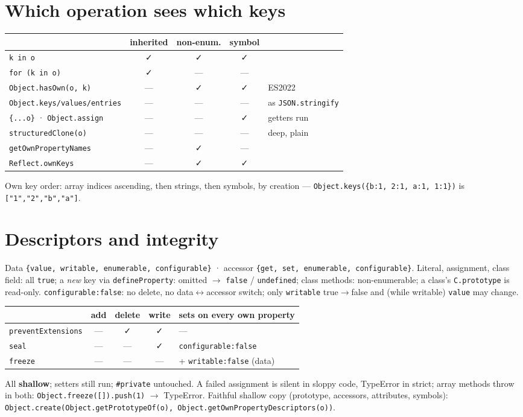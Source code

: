 \documentclass[8pt]{extarticle}
\newcommand\ct[1]{\texttt{#1}}
\begin{document}
\begin{multicols}{2}
\section{Which operation sees which keys}
{\scriptsize\setlength{\tabcolsep}{2.5pt}
\begin{tabular}{@{}lccc>{\raggedright\arraybackslash}p{17mm}@{}}
\toprule
 & \textbf{inherited} & \textbf{non-enum.} & \textbf{symbol} & \\ \midrule
\ct{k in o} & ✓ & ✓ & ✓ & \\
\ct{for (k in o)} & ✓ & — & — & \\
\ct{Object.hasOwn(o, k)} & — & ✓ & ✓ & ES2022\\
\ct{Object.keys/values/entries} & — & — & — & as \ct{JSON.stringify}\\
\ct{\{...o\}} · \ct{Object.assign} & — & — & ✓ & getters run\\
\ct{structuredClone(o)} & — & — & — & deep, plain\\
\ct{getOwnPropertyNames} & — & ✓ & — & \\
\ct{Reflect.ownKeys} & — & ✓ & ✓ & \\ \bottomrule
\end{tabular}}\pdfonly{\\[1pt]}
Own key order: array indices ascending, then strings, then symbols, by creation —
\ct{Object.keys(\{b:1, 2:1, a:1, 1:1\})} is \ct{["1","2","b","a"]}.

\section{Descriptors and integrity}
Data \ct{\{value, writable, enumerable, configurable\}} · accessor \ct{\{get, set, enumerable,
configurable\}}. Literal, assignment, class field: all \ct{true}; a \emph{new} key via
\ct{defineProperty}: omitted $\to$ \ct{false} / \ct{undefined}; class methods: non-enumerable;
a class's \ct{C.prototype} is read-only. \ct{configurable:false}: no delete, no
data$\leftrightarrow$accessor switch; only \ct{writable} true$\to$false and (while writable)
\ct{value} may change.\pdfonly{\\[2pt]}\htmlonly{\\}
{\scriptsize\setlength{\tabcolsep}{3pt}
\begin{tabular}{@{}lcccl@{}}
\toprule
 & \textbf{add} & \textbf{delete} & \textbf{write} & \textbf{sets on every own property}\\ \midrule
\ct{preventExtensions} & — & ✓ & ✓ & —\\
\ct{seal} & — & — & ✓ & \ct{configurable:false}\\
\ct{freeze} & — & — & — & + \ct{writable:false} (data)\\ \bottomrule
\end{tabular}}\pdfonly{\\[1pt]}
All \textbf{shallow}; setters still run; \ct{\#private} untouched. A failed assignment is silent
in sloppy code, TypeError in strict; array methods throw in both:
\ct{Object.freeze([]).push(1)} $\to$ TypeError. Faithful shallow copy (prototype, accessors, attributes, symbols):
\ct{Object.create(Object.getPrototypeOf(o), Object.getOwnPropertyDescriptors(o))}.


\end{multicols}
\end{document}
